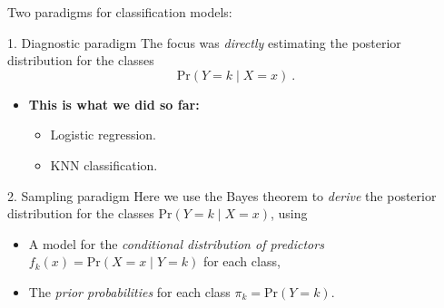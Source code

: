 \documentclass[
  10pt,
  ignorenonframetext,
]{beamer}
\providecommand{\tightlist}{%
  \setlength{\itemsep}{0pt}\setlength{\parskip}{0pt}}
\begin{document}
\begin{frame}{Two paradigms for classification models:}
\protect\hypertarget{two-paradigms-for-classification-models}{}
\begin{block}{1. Diagnostic paradigm}
\protect\hypertarget{diagnostic-paradigm}{}
The focus was \emph{directly} estimating the posterior distribution for
the classes \[\text{Pr}(Y=k \mid X=x)\ .\]

\begin{itemize}
\item
  \textbf{This is what we did so far:}

  \begin{itemize}
  \tightlist
  \item
    Logistic regression.
  \item
    KNN classification.
  \end{itemize}
\end{itemize}

\vspace{2mm}
\end{block}

\begin{block}{2. Sampling paradigm}
\protect\hypertarget{sampling-paradigm}{}
Here we use the Bayes theorem to \emph{derive} the posterior
distribution for the classes \(\text{Pr}(Y=k \mid X=x)\), using

\begin{itemize}
\item
  A model for the \emph{conditional distribution of predictors}
  \(f_k(x)=\text{Pr}(X=x \mid Y=k)\) for each class,
\item
  The \emph{prior probabilities} for each class
  \(\pi_k=\text{Pr}(Y=k)\).
\end{itemize}
\end{block}
\end{frame}
\end{document}
